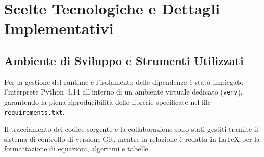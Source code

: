 \section{Scelte Tecnologiche e Dettagli Implementativi}

\subsection{Ambiente di Sviluppo e Strumenti Utilizzati}
Per la gestione del runtime e l'isolamento delle dipendenze è stato impiegato l'interprete Python~3.14 all'interno di un ambiente virtuale dedicato (\texttt{venv}), garantendo la piena riproducibilità delle librerie specificate nel file \texttt{requirements.txt}.

Il tracciamento del codice sorgente e la collaborazione sono stati gestiti tramite il sistema di controllo di versione Git, mentre la relazione è redatta in \LaTeX{} per la formattazione di equazioni, algoritmi e tabelle.

